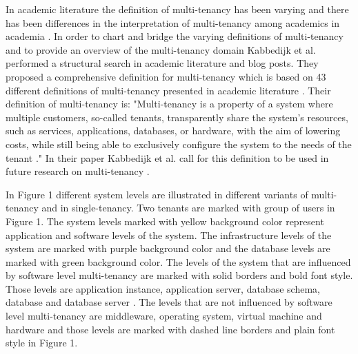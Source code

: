 \documentclass[conference]{sasmoota2017}
\begin{document}
In academic literature the definition of multi-tenancy has been varying and there has been differences in the interpretation of multi-tenancy among academics in academia \cite{Kabbedijk2015:Defining}. In order to chart and bridge the varying definitions of multi-tenancy and to provide an overview of the multi-tenancy domain Kabbedijk et al. \cite{Kabbedijk2015:Defining} performed a structural search in academic literature and blog posts. They proposed a comprehensive definition for multi-tenancy which is based on 43 different definitions of multi-tenancy presented in academic literature \cite{Kabbedijk2015:Defining}. Their definition of multi-tenancy is: "Multi-tenancy is a property of a system where multiple customers, so-called tenants, transparently share the system's resources, such as services, applications, databases, or hardware, with the aim of lowering costs, while still being able to exclusively configure the system to the needs of the tenant \cite{Kabbedijk2015:Defining}." In their paper Kabbedijk et al. call for this definition to be used in future research on multi-tenancy \cite{Kabbedijk2015:Defining}.

In Figure 1 different system levels are illustrated in different variants of multi-tenancy and in single-tenancy. Two tenants are marked with group of users in Figure 1. The system levels marked with yellow background color represent application and software levels of the system. The infrastructure levels of the system are marked with purple background color and the database levels are marked with green background color. The levels of the system that are influenced by software level multi-tenancy are marked with solid borders and bold font style. Those levels are application instance, application server, database schema, database and database server \cite{Kabbedijk2015:Defining}. The levels that are not influenced by software level multi-tenancy are middleware, operating system, virtual machine and hardware and those levels are marked with dashed line borders and plain font style in Figure 1. 
\end{document}

